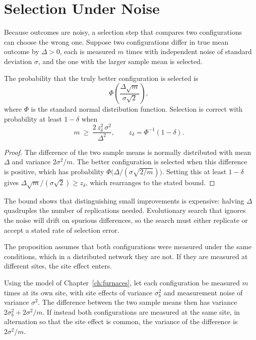 \section{Selection Under Noise}

Because outcomes are noisy, a selection step that compares two configurations can choose the wrong one. Suppose two configurations differ in true mean outcome by $\Delta>0$, each is measured $m$ times with independent noise of standard deviation $\sigma$, and the one with the larger sample mean is selected.

\begin{proposition}
\label{prop:selection}
The probability that the truly better configuration is selected is
\[
\Phi\!\left(\frac{\Delta\sqrt{m}}{\sigma\sqrt{2}}\right),
\]
where $\Phi$ is the standard normal distribution function. Selection is correct with probability at least $1-\delta$ when
\[
m\ \ge\ \frac{2\,z_{\delta}^{2}\,\sigma^{2}}{\Delta^{2}},\qquad z_\delta=\Phi^{-1}(1-\delta).
\]
\end{proposition}

\begin{proof}
The difference of the two sample means is normally distributed with mean $\Delta$ and variance $2\sigma^{2}/m$. The better configuration is selected when this difference is positive, which has probability $\Phi\bigl(\Delta/(\sigma\sqrt{2/m})\bigr)$. Setting this at least $1-\delta$ gives $\Delta\sqrt{m}/(\sigma\sqrt2)\ge z_\delta$, which rearranges to the stated bound.
\end{proof}

The bound shows that distinguishing small improvements is expensive: halving $\Delta$ quadruples the number of replications needed. Evolutionary search that ignores the noise will drift on spurious differences, so the search must either replicate or accept a stated rate of selection error.

The proposition assumes that both configurations were measured under the same conditions, which in a distributed network they are not. If they are measured at different sites, the site effect enters.

\begin{proposition}
\label{prop:sitevariance}
Using the model of Chapter~\ref{ch:furnaces}, let each configuration be measured $m$ times at its own site, with site effects of variance $\sigma_b^{2}$ and measurement noise of variance $\sigma^{2}$. The difference between the two sample means then has variance $2\sigma_b^{2}+2\sigma^{2}/m$. If instead both configurations are measured at the same site, in alternation so that the site effect is common, the variance of the difference is $2\sigma^{2}/m$.
\end{proposition}

